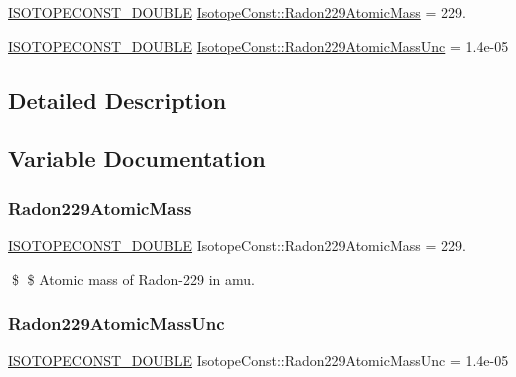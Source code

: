 \begin{DoxyCompactItemize}
\item 
\mbox{\hyperlink{group___isotope_const-_macros_ga8f45a7272ce02c0b4c65c44636ed719a}{I\+S\+O\+T\+O\+P\+E\+C\+O\+N\+S\+T\+\_\+\+D\+O\+U\+B\+LE}} \mbox{\hyperlink{group___isotope_const-_radon-_rn229_ga79b7609cc8f59579bdbb3db25f1b58b0}{Isotope\+Const\+::\+Radon229\+Atomic\+Mass}} = 229.
\item 
\mbox{\hyperlink{group___isotope_const-_macros_ga8f45a7272ce02c0b4c65c44636ed719a}{I\+S\+O\+T\+O\+P\+E\+C\+O\+N\+S\+T\+\_\+\+D\+O\+U\+B\+LE}} \mbox{\hyperlink{group___isotope_const-_radon-_rn229_ga39eb4c21e5e53776522251d921877b45}{Isotope\+Const\+::\+Radon229\+Atomic\+Mass\+Unc}} = 1.\+4e-\/05
\end{DoxyCompactItemize}


\subsection{Detailed Description}


\subsection{Variable Documentation}
\mbox{\label{group___isotope_const-_radon-_rn229_ga79b7609cc8f59579bdbb3db25f1b58b0}} 
\subsubsection{\texorpdfstring{Radon229\+Atomic\+Mass}{Radon229AtomicMass}}
{\footnotesize\ttfamily \mbox{\hyperlink{group___isotope_const-_macros_ga8f45a7272ce02c0b4c65c44636ed719a}{I\+S\+O\+T\+O\+P\+E\+C\+O\+N\+S\+T\+\_\+\+D\+O\+U\+B\+LE}} Isotope\+Const\+::\+Radon229\+Atomic\+Mass = 229.}

\$ \$ Atomic mass of Radon-\/229 in amu. \mbox{\label{group___isotope_const-_radon-_rn229_ga39eb4c21e5e53776522251d921877b45}} 
\subsubsection{\texorpdfstring{Radon229\+Atomic\+Mass\+Unc}{Radon229AtomicMassUnc}}
{\footnotesize\ttfamily \mbox{\hyperlink{group___isotope_const-_macros_ga8f45a7272ce02c0b4c65c44636ed719a}{I\+S\+O\+T\+O\+P\+E\+C\+O\+N\+S\+T\+\_\+\+D\+O\+U\+B\+LE}} Isotope\+Const\+::\+Radon229\+Atomic\+Mass\+Unc = 1.\+4e-\/05}

